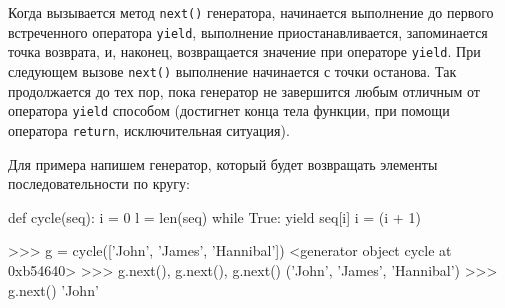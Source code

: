 Когда вызывается метод \lstinline{next()} генератора, начинается выполнение до первого встреченного оператора \lstinline{yield}, выполнение приостанавливается, запоминается точка возврата, и, наконец, возвращается значение при операторе \lstinline{yield}. При следующем вызове \lstinline{next()} выполнение начинается с точки останова. Так продолжается до тех пор, пока генератор не завершится любым отличным от оператора \lstinline{yield} способом (достигнет конца тела функции, при помощи оператора \lstinline{return}, исключительная ситуация).

Для примера напишем генератор, который будет возвращать элементы последовательности по кругу:
\begin{pylst}{}{}
def cycle(seq):
    i =  0
    l = len(seq)
    while True:
        yield seq[i]
        i = (i + 1) %

>>> g = cycle(['John', 'James', 'Hannibal'])
<generator object cycle at 0xb54640>
>>> g.next(), g.next(), g.next()
('John', 'James', 'Hannibal')
>>> g.next()
'John'
\end{pylst}

